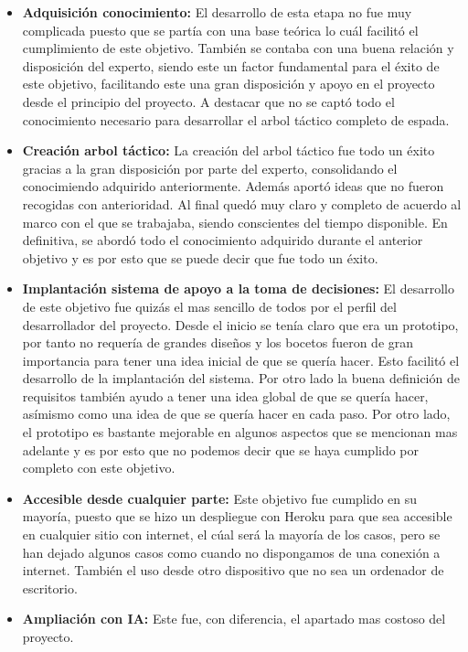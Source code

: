 \begin{itemize}
  \item \textbf{Adquisición conocimiento:} El desarrollo de esta etapa no fue muy complicada
    puesto que se partía con una base teórica lo cuál facilitó el cumplimiento de este objetivo.
    También se contaba con una buena relación y disposición del experto, siendo este un factor
    fundamental para el éxito de este objetivo, facilitando este una gran disposición y apoyo
    en el proyecto desde el principio del proyecto. A destacar que no se captó todo el conocimiento
    necesario para desarrollar el arbol táctico completo de espada.
  \item \textbf{Creación arbol táctico:} La creación del arbol táctico fue todo un éxito gracias
    a la gran disposición por parte del experto, consolidando el conocimiendo adquirido anteriormente.
    Además aportó ideas que no fueron recogidas con anterioridad. Al final quedó muy claro y completo
    de acuerdo al marco con el que se trabajaba, siendo conscientes del tiempo disponible. En definitiva,
    se abordó todo el conocimiento adquirido durante el anterior objetivo y es por esto que se
    puede decir que fue todo un éxito.
  \item \textbf{Implantación sistema de apoyo a la toma de decisiones:} El desarrollo de este
    objetivo fue quizás el mas sencillo de todos por el perfil del desarrollador del proyecto.
    Desde el inicio se tenía claro que era un prototipo, por tanto no requería de grandes diseños
    y los bocetos fueron de gran importancia para tener una idea inicial de que se quería hacer.
    Esto facilitó el desarrollo de la implantación del sistema. Por otro lado la buena definición
    de requisitos también ayudo a tener una idea global de que se quería hacer, asímismo como
    una idea de que se quería hacer en cada paso. Por otro lado, el prototipo es bastante mejorable
    en algunos aspectos que se mencionan mas adelante y es por esto que no podemos decir que se
    haya cumplido por completo con este objetivo.
  \item \textbf{Accesible desde cualquier parte:} Este objetivo fue cumplido en su mayoría, puesto
    que se hizo un despliegue con Heroku para que sea accesible en cualquier sitio con internet,
    el cúal será la mayoría de los casos, pero se han dejado algunos casos como cuando no dispongamos
    de una conexión a internet. También el uso desde otro dispositivo que no sea un ordenador de
    escritorio.
  \item \textbf{Ampliación con IA:} Este fue, con diferencia, el apartado mas costoso del proyecto.

\end{itemize}
